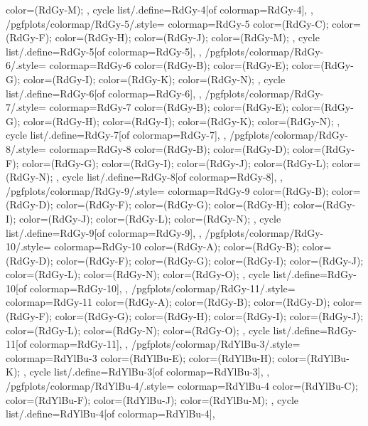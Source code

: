 {{{      color=(RdGy-M);
    },
    cycle list/.define={RdGy-4}{[of colormap=RdGy-4]},
  },
  /pgfplots/colormap/RdGy-5/.style={
    colormap={RdGy-5}{
      color=(RdGy-C);
      color=(RdGy-F);
      color=(RdGy-H);
      color=(RdGy-J);
      color=(RdGy-M);
    },
    cycle list/.define={RdGy-5}{[of colormap=RdGy-5]},
  },
  /pgfplots/colormap/RdGy-6/.style={
    colormap={RdGy-6}{
      color=(RdGy-B);
      color=(RdGy-E);
      color=(RdGy-G);
      color=(RdGy-I);
      color=(RdGy-K);
      color=(RdGy-N);
    },
    cycle list/.define={RdGy-6}{[of colormap=RdGy-6]},
  },
  /pgfplots/colormap/RdGy-7/.style={
    colormap={RdGy-7}{
      color=(RdGy-B);
      color=(RdGy-E);
      color=(RdGy-G);
      color=(RdGy-H);
      color=(RdGy-I);
      color=(RdGy-K);
      color=(RdGy-N);
    },
    cycle list/.define={RdGy-7}{[of colormap=RdGy-7]},
  },
  /pgfplots/colormap/RdGy-8/.style={
    colormap={RdGy-8}{
      color=(RdGy-B);
      color=(RdGy-D);
      color=(RdGy-F);
      color=(RdGy-G);
      color=(RdGy-I);
      color=(RdGy-J);
      color=(RdGy-L);
      color=(RdGy-N);
    },
    cycle list/.define={RdGy-8}{[of colormap=RdGy-8]},
  },
  /pgfplots/colormap/RdGy-9/.style={
    colormap={RdGy-9}{
      color=(RdGy-B);
      color=(RdGy-D);
      color=(RdGy-F);
      color=(RdGy-G);
      color=(RdGy-H);
      color=(RdGy-I);
      color=(RdGy-J);
      color=(RdGy-L);
      color=(RdGy-N);
    },
    cycle list/.define={RdGy-9}{[of colormap=RdGy-9]},
  },
  /pgfplots/colormap/RdGy-10/.style={
    colormap={RdGy-10}{
      color=(RdGy-A);
      color=(RdGy-B);
      color=(RdGy-D);
      color=(RdGy-F);
      color=(RdGy-G);
      color=(RdGy-I);
      color=(RdGy-J);
      color=(RdGy-L);
      color=(RdGy-N);
      color=(RdGy-O);
    },
    cycle list/.define={RdGy-10}{[of colormap=RdGy-10]},
  },
  /pgfplots/colormap/RdGy-11/.style={
    colormap={RdGy-11}{
      color=(RdGy-A);
      color=(RdGy-B);
      color=(RdGy-D);
      color=(RdGy-F);
      color=(RdGy-G);
      color=(RdGy-H);
      color=(RdGy-I);
      color=(RdGy-J);
      color=(RdGy-L);
      color=(RdGy-N);
      color=(RdGy-O);
    },
    cycle list/.define={RdGy-11}{[of colormap=RdGy-11]},
  },
  /pgfplots/colormap/RdYlBu-3/.style={
    colormap={RdYlBu-3}{
      color=(RdYlBu-E);
      color=(RdYlBu-H);
      color=(RdYlBu-K);
    },
    cycle list/.define={RdYlBu-3}{[of colormap=RdYlBu-3]},
  },
  /pgfplots/colormap/RdYlBu-4/.style={
    colormap={RdYlBu-4}{
      color=(RdYlBu-C);
      color=(RdYlBu-F);
      color=(RdYlBu-J);
      color=(RdYlBu-M);
    },
    cycle list/.define={RdYlBu-4}{[of colormap=RdYlBu-4]},
}}

